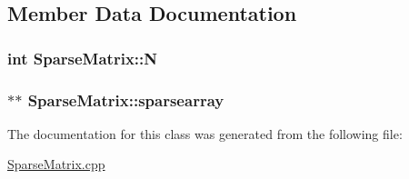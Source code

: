 \subsection{Member Data Documentation}
\subsubsection[{\texorpdfstring{N}{N}}]{\setlength{\rightskip}{0pt plus 5cm}int Sparse\+Matrix\+::N\hspace{0.3cm}{\ttfamily [private]}}\hypertarget{classSparseMatrix_a4295e15f08092c633480eff6527918ab}{}\label{classSparseMatrix_a4295e15f08092c633480eff6527918ab}
\subsubsection[{\texorpdfstring{sparsearray}{sparsearray}}]{$\ast$$\ast$ Sparse\+Matrix\+::sparsearray\hspace{0.3cm}{\ttfamily [private]}}\hypertarget{classSparseMatrix_a20f42dd05e85c614190cd5c61c478ea0}{}\label{classSparseMatrix_a20f42dd05e85c614190cd5c61c478ea0}


The documentation for this class was generated from the following file\+:\begin{DoxyCompactItemize}
\item 
\hyperlink{SparseMatrix_8cpp}{Sparse\+Matrix.\+cpp}\end{DoxyCompactItemize}
